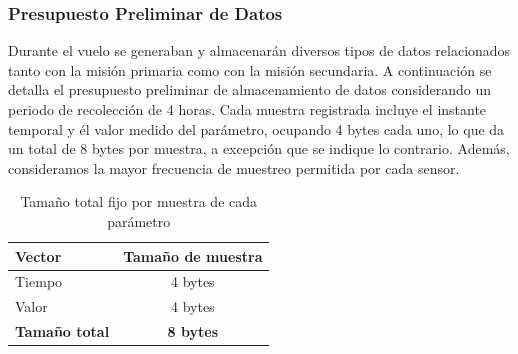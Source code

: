     \subsubsection{Presupuesto Preliminar de Datos}
      Durante el vuelo se generaban y almacenarán diversos tipos de datos relacionados tanto con la misión primaria como
      con la misión secundaria. A continuación se detalla el presupuesto preliminar de almacenamiento de datos
      considerando un periodo de recolección de 4 horas.  Cada muestra registrada incluye el instante temporal y él
      valor medido del parámetro, ocupando 4 bytes cada uno, lo que da un total de 8 bytes por muestra, a excepción que 
      se indique lo contrario. Además, consideramos la mayor frecuencia de muestreo permitida por cada sensor.

      \begin{table}[H]
      \centering
      \begin{tabular}{|l|c|}
      \hline
      \textbf{Vector} & \textbf{Tamaño de muestra} \\
      \hline
      Tiempo & 4 bytes \\
      Valor  & 4 bytes \\
      \hline
      \textbf{Tamaño total} & \textbf{8 bytes} \\
      \hline
      \end{tabular}
      \caption{Tamaño total fijo por muestra de cada parámetro}
      \label{tab:tamanio_muestra}
      \end{table}

